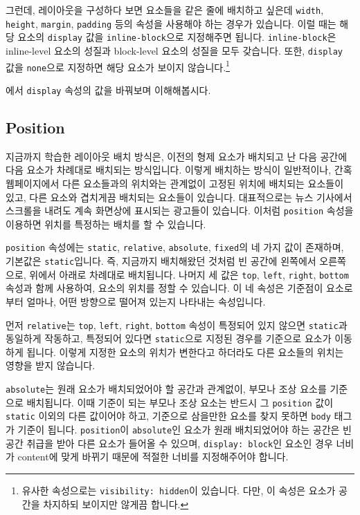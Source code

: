 그런데, 레이아웃을 구성하다 보면 요소들을 같은 줄에 배치하고 싶은데 \verb|width|, \verb|height|, \verb|margin|, \verb|padding| 등의 속성을 사용해야 하는 경우가 있습니다. 이럴 때는 해당 요소의 \verb|display| 값을 \verb|inline-block|으로 지정해주면 됩니다. \verb|inline-block|은 inline-level 요소의 성질과 block-level 요소의 성질을 모두 갖습니다. 또한, \verb|display| 값을 \verb|none|으로 지정하면 해당 요소가 보이지 않습니다.\footnote{유사한 속성으로는 \texttt{visibility: hidden}이 있습니다. 다만, 이 속성은 요소가 공간을 차지하되 보이지만 않게끔 합니다.}
 
에서 \verb|display| 속성의 값을 바꿔보며 이해해봅시다. 

\subsection*{Position}
지금까지 학습한 레이아웃 배치 방식은, 이전의 형제 요소가 배치되고 난 다음 공간에 다음 요소가 차례대로 배치되는 방식입니다. 이렇게 배치하는 방식이 일반적이나, 간혹 웹페이지에서 다른 요소들과의 위치와는 관계없이 고정된 위치에 배치되는 요소들이 있고, 다른 요소와 겹치게끔 배치되는 요소들이 있습니다. 대표적으로는 뉴스 기사에서 스크롤을 내려도 계속 화면상에 표시되는 광고들이 있습니다. 이처럼 \verb|position| 속성을 이용하면 위치를 특정하는 배치를 할 수 있습니다. 

\verb|position| 속성에는 \verb|static|, \verb|relative|, \verb|absolute|, \verb|fixed|의 네 가지 값이 존재하며, 기본값은 \verb|static|입니다. 즉, 지금까지 배치해왔던 것처럼 빈 공간에 왼쪽에서 오른쪽으로, 위에서 아래로 차례대로 배치됩니다. 나머지 세 값은 \verb|top|, \verb|left|, \verb|right|, \verb|bottom| 속성과 함께 사용하여, 요소의 위치를 정할 수 있습니다. 이 네 속성은 기준점이 요소로부터 얼마나, 어떤 방향으로 떨어져 있는지 나타내는 속성입니다.

먼저 \verb|relative|는 \verb|top|, \verb|left|, \verb|right|, \verb|bottom| 속성이 특정되어 있지 않으면 \verb|static|과 동일하게 작동하고, 특정되어 있다면 \verb|static|으로 지정된 경우를 기준으로 요소가 이동하게 됩니다. 이렇게 지정한 요소의 위치가 변한다고 하더라도 다른 요소들의 위치는 영향을 받지 않습니다. 

\verb|absolute|는 원래 요소가 배치되었어야 할 공간과 관계없이, 부모나 조상 요소를 기준으로 배치됩니다. 이때 기준이 되는 부모나 조상 요소는 반드시 그 \verb|position| 값이 \verb|static| 이외의 다른 값이어야 하고, 기준으로 삼을만한 요소를 찾지 못하면 \verb|body| 태그가 기준이 됩니다. \verb|position|이 \verb|absolute|인 요소가 원래 배치되었어야 하는 공간은 빈 공간 취급을 받아 다른 요소가 들어올 수 있으며, \verb|display: block|인 요소인 경우 너비가 content에 맞게 바뀌기 때문에 적절한 너비를 지정해주어야 합니다. 

